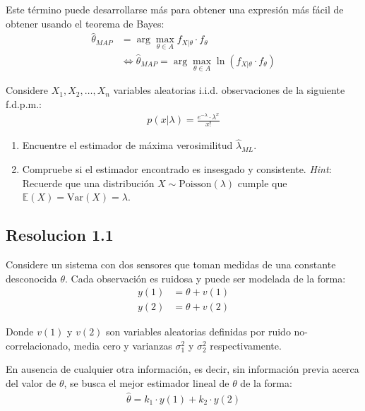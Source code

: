 \documentclass[
  11pt,
  letterpaper,
   addpoints,
  ]{exam}
\begin{document}
Este término puede desarrollarse más para obtener una expresión más fácil de obtener usando el teorema de Bayes:
\begin{align}
\hat{\theta}_{MAP} &= \arg \max_{\theta \in A} f_{X|\theta} \cdot f_\theta \\
&\iff \hat{\theta}_{MAP} = \arg \max_{\theta \in A} \ln(f_{X|\theta} \cdot f_\theta)
\end{align}
\newpage
\begin{questions}
    \question 
    Considere $X_1, X_2, \dots, X_n$ variables aleatorias i.i.d. observaciones de la siguiente f.d.p.m.:
    \begin{align}
    p(x|\lambda) = \frac{e^{-\lambda} \cdot \lambda^x}{x!}
    \end{align}
    
    \begin{enumerate}
        \item Encuentre el estimador de máxima verosimilitud $\hat{\lambda}_{ML}$.
        \item Compruebe si el estimador encontrado es insesgado y consistente. \textit{Hint}: Recuerde que una distribución $X \sim \text{Poisson}(\lambda)$ cumple que $\mathbb{E}(X) = \text{Var}(X) = \lambda$.
    \end{enumerate}
      
    \begin{solution}
        \subsection*{Resolucion 1.1}
    \end{solution}
\question  Considere un sistema con dos sensores que toman medidas de una constante desconocida $\theta$. Cada observación es ruidosa y puede ser modelada de la forma:
\begin{align}
y(1) &= \theta + v(1) \\
y(2) &= \theta + v(2)
\end{align}

Donde $v(1)$ y $v(2)$ son variables aleatorias definidas por ruido no-correlacionado, media cero y varianzas $\sigma_1^2$ y $\sigma_2^2$ respectivamente.

En ausencia de cualquier otra información, es decir, sin información previa acerca del valor de $\theta$, se busca el mejor estimador lineal de $\theta$ de la forma:
\begin{align}
\hat{\theta} = k_1 \cdot y(1) + k_2 \cdot y(2)
\end{align}


\end{questions}
\end{document}
